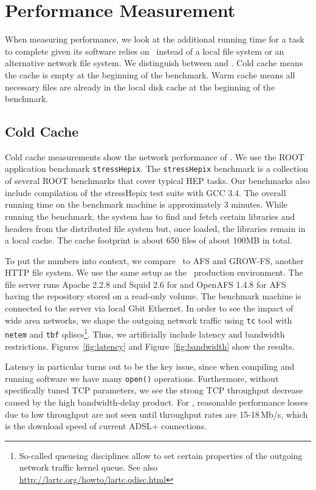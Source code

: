 \chapter{Performance Measurement}

When measuring performance, we look at the additional running time for a task to complete given its software relies on \cvmfs\ instead of a local file system or an alternative network file system.
We distinguish between  and .
Cold cache means the cache is empty at the beginning of the benchmark.
Warm cache means all necessary files are already in the local disk cache at the beginning of the benchmark.

\section{Cold Cache}

Cold cache measurements show the network performance of \cvmfs.
We use the ROOT application benchmark \texttt{stressHepix}. 
The \texttt{stressHepix} benchmark is a collection of several ROOT benchmarks that cover typical HEP tasks. 
Our benchmarks also include compilation of the stressHepix test suite with GCC 3.4. 
The overall running time on the benchmark machine is approximately 3 minutes.
While running the benchmark, the system has to find and fetch certain libraries and headers from the distributed file system but, once loaded, the libraries remain in a local cache. 
The cache footprint is about 650 files of about 100MB in total.

To put the numbers into context, we compare \cvmfs\ to {\scshape AFS} and {\scshape GROW-FS}, another HTTP file system. 
We use the same setup as the \cernvm\ production environment. The file server runs Apache 2.2.8 and Squid 2.6 for \cvmfs and OpenAFS 1.4.8 for {\scshape AFS} having the repository stored on a read-only volume. 
The benchmark machine is connected to the server via local Gbit Ethernet.
In order to see the impact of wide area networks, we shape the outgoing network traffic using \texttt{tc} tool with \texttt{netem} and \texttt{tbf} qdiscs\footnote{So-called queueing disciplines allow to set certain properties of the outgoing network traffic kernel queue. See also \url{http://lartc.org/howto/lartc.qdisc.html}}. 
Thus, we artificially include latency and bandwidth restrictions.
Figures~\ref{fig:latency} and Figure~\ref{fig:bandwidth} show the results.

Latency in particular turns out to be the key issue, since when compiling and running software we have many \texttt{open()} operations.
Furthermore, without specifically tuned TCP parameters, we see the strong TCP throughput decrease caused by the high bandwidth-delay product. 
For \cvmfs, reasonable performance losses due to low throughput are not seen until throughput rates are 15-18\,Mb/s, which is the download speed of current ADSL+ connections.

